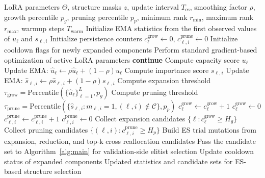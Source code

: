 \documentclass{article}
\newcommand{\method}{\textsc{EvoRank-LoRA}}
\begin{document}
\begin{algorithm}[t]
\caption{Dynamic thresholding and candidate identification in \method}
\label{alg:dynamic_threshold}
\footnotesize
\begin{algorithmic}[1]
\Require LoRA parameters $\Theta$, structure masks $z$, update interval $T_{\mathrm{es}}$, smoothing factor $\rho$, growth percentile $p_g$, pruning percentile $p_p$, minimum rank $r_{\min}$, maximum rank $r_{\max}$, warmup steps $T_{\mathrm{warm}}$
\State Initialize EMA statistics from the first observed values of $u_\ell$ and $s_{\ell,i}$
\State Initialize persistence counters $c^{\mathrm{grow}}_\ell \leftarrow 0$, $c^{\mathrm{prune}}_{\ell,i} \leftarrow 0$
\State Initialize cooldown flags for newly expanded components
    \State Perform standard gradient-based optimization of active LoRA parameters
        \State \textbf{continue}
    \EndIf
            \State Compute capacity score $u_\ell$
            \State Update EMA: $\hat{u}_\ell \leftarrow \rho \hat{u}_\ell + (1-\rho) u_\ell$
        \EndFor
            \State Compute importance score $s_{\ell,i}$
            \State Update EMA: $\hat{s}_{\ell,i} \leftarrow \rho \hat{s}_{\ell,i} + (1-\rho) s_{\ell,i}$
        \EndFor
        \State Compute expansion threshold $\tau_{\mathrm{grow}} = \mathrm{Percentile}(\{\hat{u}_\ell\}_{\ell=1}^{L}, p_g)$
        \State Compute pruning threshold $\tau_{\mathrm{prune}} = \mathrm{Percentile}(\{\hat{s}_{\ell,i}: m_{\ell,i}=1, (\ell,i)\notin\mathcal{C}\}, p_p)$
                \State $c^{\mathrm{grow}}_\ell \leftarrow c^{\mathrm{grow}}_\ell + 1$
            \Else
                \State $c^{\mathrm{grow}}_\ell \leftarrow 0$
            \EndIf
        \EndFor
                \State $c^{\mathrm{prune}}_{\ell,i} \leftarrow c^{\mathrm{prune}}_{\ell,i} + 1$
            \Else
                \State $c^{\mathrm{prune}}_{\ell,i} \leftarrow 0$
            \EndIf
        \EndFor
        \State Collect expansion candidates $\{ \ell : c^{\mathrm{grow}}_\ell \ge H_g \}$
        \State Collect pruning candidates $\{ (\ell,i) : c^{\mathrm{prune}}_{\ell,i} \ge H_p \}$
        \State Build ES trial mutations from expansion, reduction, and top-k cross reallocation candidates
        \State Pass the candidate set to Algorithm~\ref{alg:main} for validation-side elitist selection
        \State Update cooldown status of expanded components
    \EndIf
\EndFor
\State \Return Updated statistics and candidate sets for ES-based structure selection
\end{algorithmic}
\end{algorithm}
\end{document}
